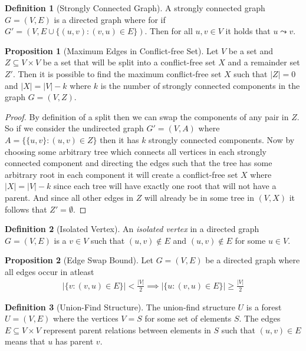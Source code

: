 \documentclass[a4paper,12pt]{article}
\theoremstyle{definition}
\newtheorem{definition}{Definition}[section]
\newtheorem{proposition}{Proposition}[section]
\begin{document}
\begin{definition}[Strongly Connected Graph]
    A strongly connected graph $G = (V, E)$ is a directed graph where for if $G'
    = (V, E \cup \{(u, v) : (v, u) \in E\})$. Then for all $u, v \in V$ it holds
    that $u \leadsto v$.
\end{definition}

\begin{proposition}[Maximum Edges in Conflict-free Set]
    Let $V$ be a set and $Z \subseteq V \times V$ be a set that will be split into
    a conflict-free set $X$ and a remainder set $Z'$. Then it is possible to
    find the maximum conflict-free set $X$ such that $|Z| = 0$ and $|X| = |V| -
    k$ where $k$ is the number of strongly connected components in the graph
    $G = (V, Z)$.
\end{proposition}

\begin{proof}
    By definition of a split then we can swap the components of any pair in $Z$.
    So if we consider the undirected graph $G' = (V, A)$ where $A = \{\{u, v\} :
    (u, v) \in Z\}$ then it has $k$ strongly connected components. Now by
    choosing some arbitrary tree which connects all vertices in each strongly
    connected component and directing the edges such that the tree has some
    arbitrary root in each component it will create a conflict-free set $X$
    where $|X| = |V| - k$ since each tree will have exactly one root that will
    not have a parent. And since all other edges in $Z$ will already be in some
    tree in $(V, X)$ it follows that $Z' = \emptyset$.
\end{proof}

\begin{definition}[Isolated Vertex]
    An \emph{isolated vertex} in a directed graph $G = (V, E)$ is a $v \in V$
    such that $(u, v) \notin E$ and $(u, v) \notin E$ for some $u \in V$.
\end{definition}

\begin{proposition}[Edge Swap Bound]
    Let $G = (V, E)$ be a directed graph where all edges occur in atleast
    \begin{align*}
        |\{v : (v, u) \in E\}| < \frac{|V|}{2} \implies |\{u : (v, u) \in E\}| \geq \frac{|V|}{2} 
    \end{align*}
\end{proposition}

\begin{definition}[Union-Find Structure]
    The union-find structure $U$ is a forest $U = (V, E)$ where the vertices $V
    = S$ for some set of elements $S$. The edges $E \subseteq V \times V$
    represent parent relations between elements in $S$ such that $(u, v) \in E$
    means that $u$ has parent $v$.
\end{definition}
\end{document}

